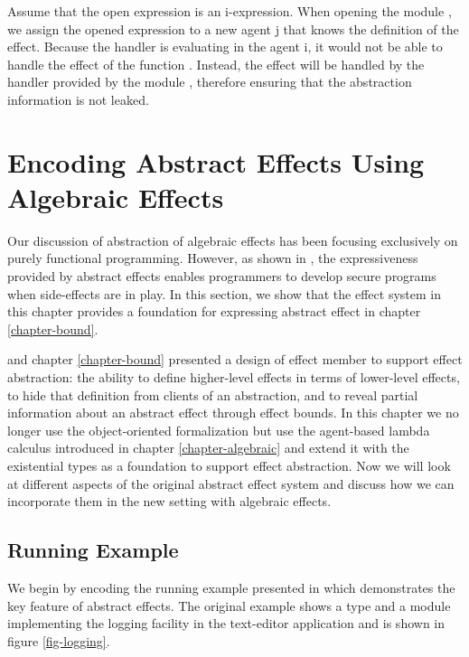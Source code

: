Assume that the open expression is an i-expression. When opening the module , we assign the opened expression  to a new agent j that  knows the definition of the  effect. Because the  handler is evaluating in the agent i, it would not be able to handle the effect  of the function . Instead, the  effect will be handled by the handler provided by the module , therefore ensuring that the abstraction information is not leaked.



\section{Encoding Abstract Effects Using Algebraic Effects}
Our discussion of abstraction of algebraic effects has been focusing exclusively on purely functional programming. However, as shown in \citet{melicher20}, the expressiveness provided by abstract effects enables programmers to develop secure programs when side-effects are in play. In this section, we show that the effect system in this chapter provides a foundation for expressing abstract effect in chapter \ref{chapter-bound}. 

 \citet{melicher20} and chapter \ref{chapter-bound} presented a design of effect member to support effect abstraction: the ability to define higher-level effects in terms of lower-level effects, to hide that definition from clients of an abstraction, and to reveal partial information about an abstract effect through effect bounds. In this chapter we no longer use the object-oriented formalization but use the agent-based lambda calculus introduced in chapter \ref{chapter-algebraic} and extend it with the existential types as a foundation to support effect abstraction. Now we will look at different aspects of the original abstract effect system and discuss how we can incorporate them in the new setting with algebraic effects.
 
 
\subsection{Running Example}
We begin by encoding the running example presented in \citet{melicher20} which demonstrates the key feature of abstract effects. The original example shows a type and a module implementing the logging facility in the text-editor application and is shown in figure \ref{fig-logging}. 

